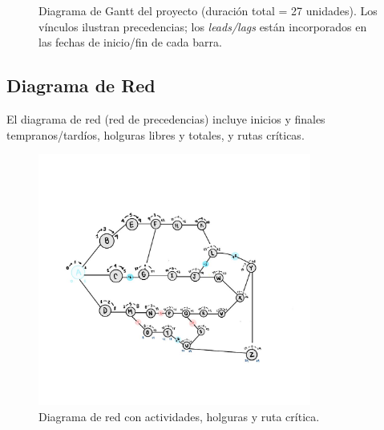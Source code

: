 \begin{figure}[H]
\begin{ganttchart}







\end{ganttchart}
\caption{Diagrama de Gantt del proyecto (duración total = 27 unidades). Los vínculos ilustran precedencias; los \emph{leads/lags} están incorporados en las fechas de inicio/fin de cada barra.}
\label{fig:gantt}
\end{figure}

\subsection{Diagrama de Red}

El diagrama de red (red de precedencias) incluye inicios y finales tempranos/tardíos, holguras libres y totales, y rutas críticas.

\begin{figure}[H]
  \centering
  \includegraphics[width=0.8\textwidth]{Figures/0. General/network_diagram.jpeg}
  \caption{Diagrama de red con actividades, holguras y ruta crítica.}
  \label{fig:red}
\end{figure}

